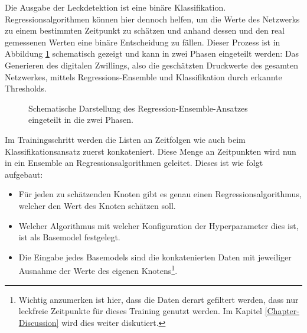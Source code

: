 Die Ausgabe der Leckdetektion ist eine binäre Klassifikation. Regressionsalgorithmen können hier dennoch helfen,
 um die Werte des Netzwerks zu einem bestimmten Zeitpunkt zu schätzen und anhand dessen und den real gemessenen
 Werten eine binäre Entscheidung zu fällen. Dieser Prozess ist in Abbildung \ref{fig:practice-ensemble} schematisch
 gezeigt und kann in zwei Phasen eingeteilt werden: Das Generieren des digitalen Zwillings, also die geschätzten
 Druckwerte des gesamten Netzwerkes, mittels Regressions-Ensemble und Klassifikation durch erkannte Thresholds.

\begin{figure}
    \centering
    \caption{Schematische Darstellung des Regression-Ensemble-Ansatzes eingeteilt in die zwei Phasen.}
    \label{fig:practice-ensemble}
\end{figure}

Im Trainingsschritt werden die Listen an Zeitfolgen wie auch beim Klassifikationsansatz zuerst konkateniert.
 Diese Menge an Zeitpunkten wird nun in ein Ensemble an Regressionsalgorithmen geleitet. Dieses ist wie folgt
 aufgebaut:

\begin{itemize}
    \item Für jeden zu schätzenden Knoten gibt es genau einen Regressionsalgorithmus, welcher den Wert des Knoten
     schätzen soll.
    \item Welcher Algorithmus mit welcher Konfiguration der Hyperparameter dies ist, ist als Basemodel festgelegt.
    \item Die Eingabe jedes Basemodels sind die konkatenierten Daten mit jeweiliger Ausnahme der Werte des eigenen
     Knotens\footnote{Wichtig anzumerken ist hier, dass die Daten derart gefiltert werden, dass nur leckfreie
     Zeitpunkte für dieses Training genutzt werden. Im Kapitel \ref{Chapter-Discussion} wird dies weiter
     diskutiert.}.
\end{itemize}

